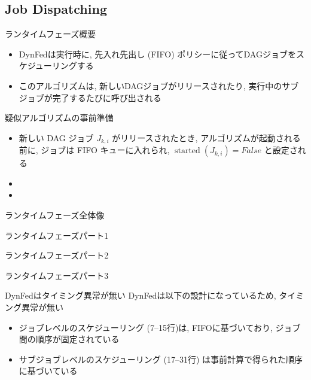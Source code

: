 \subsection{Job Dispatching}
\label{ssec: Job Dispatching}

\begin{frame}{ランタイムフェーズ概要}
    \begin{itemize}
        \item DynFedは実行時に, 先入れ先出し (FIFO) ポリシーに従ってDAGジョブをスケジューリングする
        \item このアルゴリズムは, 新しいDAGジョブがリリースされたり, 実行中のサブジョブが完了するたびに呼び出される
    \end{itemize}
\end{frame}

\begin{frame}{疑似アルゴリズムの事前準備}
    \begin{itemize}
        \item 新しい DAG ジョブ $J_{k, i}$ がリリースされたとき, アルゴリズムが起動される前に, ジョブは FIFO キューに入れられ, $\operatorname{started}\left(J_{k, i}\right)= False$ と設定される
        \item {}
        \item {}
    \end{itemize}
\end{frame}

\begin{frame}{ランタイムフェーズ全体像}
\end{frame}

\begin{frame}{ランタイムフェーズパート1}
\end{frame}

\begin{frame}{ランタイムフェーズパート2}
\end{frame}

\begin{frame}{ランタイムフェーズパート3}
\end{frame}

\begin{frame}{DynFedはタイミング異常が無い}
    DynFedは以下の設計になっているため, タイミング異常が無い
    \begin{itemize}
        \item ジョブレベルのスケジューリング (7--15行)は, FIFOに基づいており, ジョブ間の順序が固定されている
        \item サブジョブレベルのスケジューリング (17--31行) は事前計算で得られた順序に基づいている
    \end{itemize}
\end{frame}
